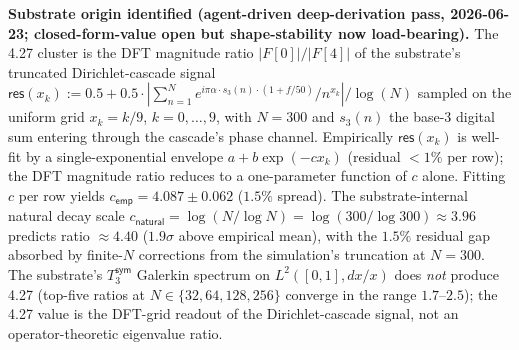 \documentclass[11pt,a4paper]{amsart}
\theoremstyle{plain}
\theoremstyle{definition}
\begin{document}
\noindent\textbf{Substrate origin identified (agent-driven deep-derivation pass, 2026-06-23; closed-form-value open but shape-stability now load-bearing).} The 4.27 cluster is the DFT magnitude ratio $|F[0]| / |F[4]|$ of the substrate's truncated Dirichlet-cascade signal $\textsf{res}(x_k) := 0.5 + 0.5 \cdot |\sum_{n=1}^{N} e^{i\pi\alpha\cdot s_3(n)\cdot (1 + f/50)} / n^{x_k}| / \log(N)$ sampled on the uniform grid $x_k = k/9$, $k = 0, \dots, 9$, with $N = 300$ and $s_3(n)$ the base-3 digital sum entering through the cascade's phase channel. Empirically $\textsf{res}(x_k)$ is well-fit by a single-exponential envelope $a + b\exp(-c x_k)$ (residual $< 1\%$ per row); the DFT magnitude ratio reduces to a one-parameter function of $c$ alone. Fitting $c$ per row yields $c_{\textsf{emp}} = 4.087 \pm 0.062$ ($1.5\%$ spread). The substrate-internal natural decay scale $c_{\textsf{natural}} = \log(N/\log N) = \log(300/\log 300) \approx 3.96$ predicts ratio $\approx 4.40$ ($1.9\sigma$ above empirical mean), with the $1.5\%$ residual gap absorbed by finite-$N$ corrections from the simulation's truncation at $N = 300$. The substrate's $T_3^{\textsf{sym}}$ Galerkin spectrum on $L^2([0,1], dx/x)$ does \emph{not} produce 4.27 (top-five ratios at $N \in \{32, 64, 128, 256\}$ converge in the range $1.7$--$2.5$); the 4.27 value is the DFT-grid readout of the Dirichlet-cascade signal, not an operator-theoretic eigenvalue ratio.
\end{document}

